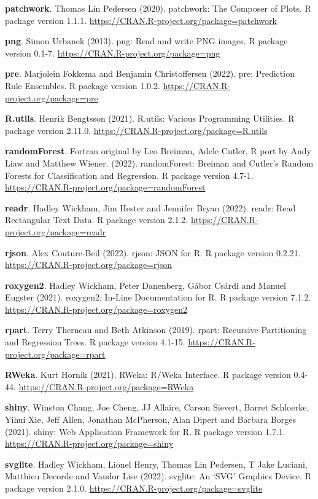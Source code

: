 \documentclass[
  10pt,
]{scrbook}
\begin{document}
\textbf{patchwork}. Thomas Lin Pedersen (2020). patchwork: The Composer of Plots. R package version 1.1.1. \url{https://CRAN.R-project.org/package=patchwork}

\textbf{png}. Simon Urbanek (2013). png: Read and write PNG images. R package version 0.1-7. \url{https://CRAN.R-project.org/package=png}

\textbf{pre}. Marjolein Fokkema and Benjamin Christoffersen (2022). pre: Prediction Rule Ensembles. R package version 1.0.2. \url{https://CRAN.R-project.org/package=pre}

\textbf{R.utils}. Henrik Bengtsson (2021). R.utils: Various Programming Utilities. R package version 2.11.0. \url{https://CRAN.R-project.org/package=R.utils}

\textbf{randomForest}. Fortran original by Leo Breiman, Adele Cutler, R port by Andy Liaw and Matthew Wiener. (2022). randomForest: Breiman and Cutler's Random Forests for Classification and
Regression. R package version 4.7-1. \url{https://CRAN.R-project.org/package=randomForest}

\textbf{readr}. Hadley Wickham, Jim Hester and Jennifer Bryan (2022). readr: Read Rectangular Text Data. R package version 2.1.2. \url{https://CRAN.R-project.org/package=readr}

\textbf{rjson}. Alex Couture-Beil (2022). rjson: JSON for R. R package version 0.2.21. \url{https://CRAN.R-project.org/package=rjson}

\textbf{roxygen2}. Hadley Wickham, Peter Danenberg, Gábor Csárdi and Manuel Eugster (2021). roxygen2: In-Line Documentation for R. R package version 7.1.2. \url{https://CRAN.R-project.org/package=roxygen2}

\textbf{rpart}. Terry Therneau and Beth Atkinson (2019). rpart: Recursive Partitioning and Regression Trees. R package version 4.1-15. \url{https://CRAN.R-project.org/package=rpart}

\textbf{RWeka}. Kurt Hornik (2021). RWeka: R/Weka Interface. R package version 0.4-44. \url{https://CRAN.R-project.org/package=RWeka}

\textbf{shiny}. Winston Chang, Joe Cheng, JJ Allaire, Carson Sievert, Barret Schloerke, Yihui Xie, Jeff Allen, Jonathan McPherson, Alan Dipert and Barbara Borges (2021). shiny: Web Application Framework for R. R package version 1.7.1. \url{https://CRAN.R-project.org/package=shiny}

\textbf{svglite}. Hadley Wickham, Lionel Henry, Thomas Lin Pedersen, T Jake Luciani, Matthieu Decorde and Vaudor Lise (2022). svglite: An `SVG' Graphics Device. R package version 2.1.0. \url{https://CRAN.R-project.org/package=svglite}
\end{document}
